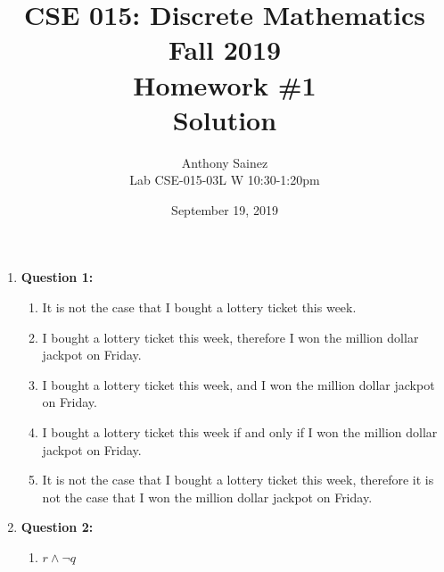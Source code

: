 \documentclass[11pt]{article}
\begin{document}
\author{Anthony Sainez\\
Lab CSE-015-03L W 10:30-1:20pm}

\title{CSE 015: Discrete Mathematics\\
Fall 2019\\
Homework \#1\\
Solution}

\date{September 19, 2019}
\maketitle

\begin{enumerate}

    \item
        \textbf{Question 1:}
    
        \begin{enumerate}[label=(\alph*)]
            \item
            It is not the case that I bought a lottery ticket this week.
            
            \item
            I bought a lottery ticket this week, therefore I won the million dollar jackpot on Friday.
            
            \item
            I bought a lottery ticket this week, and I won the million dollar jackpot on Friday. 
            
            \item
            I bought a lottery ticket this week if and only if I won the million dollar jackpot on Friday.
            
            \item It is not the case that I bought a lottery ticket this week, therefore it is not the case that I won the million dollar jackpot on Friday. 
    
        \end{enumerate}
    
    \item
        \textbf{Question 2:}
    
        \begin{enumerate}[label=(\alph*)]
            \item
            $r \land \lnot q$
            

\end{enumerate}
\end{enumerate}
\end{document}
